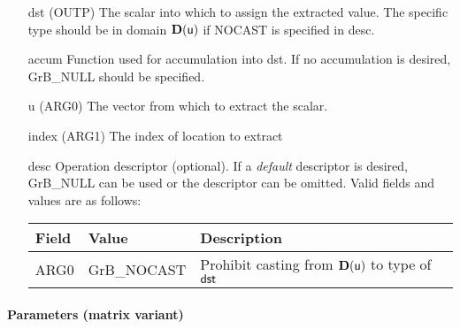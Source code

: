 \begin{itemize}[leftmargin=1in]
    \item[{\sf dst}]   ({\sf OUTP}) The scalar into which to assign the extracted value.  The specific type should be in domain $\bold{D}({\sf u})$ if {\sf NOCAST} is specified in {\sf desc}.
    \item[{\sf accum}] Function used for accumulation into dst. If no accumulation is desired,
                        {\sf GrB\_NULL} should be specified.
    \item[{\sf u}]   ({\sf ARG0}) The vector from which to extract the scalar.
    \item[{\sf index}]     ({\sf ARG1}) The index of location to extract

    \item[{\sf desc}]   Operation descriptor (optional). If a
    \emph{default} descriptor is desired, {\sf GrB\_NULL} can be
    used or the descriptor can be omitted.  Valid fields and values are as follows: \\
    \begin{tabular}{lll}
    Field  & Value & Description \\
    \hline
    {\sf ARG0} & {\sf GrB\_NOCAST} & Prohibit casting from $\bold{D}({\sf u})$ to type of ${\sf dst}$ \\
    \end{tabular}

\end{itemize}

\paragraph{Parameters (matrix variant)}

